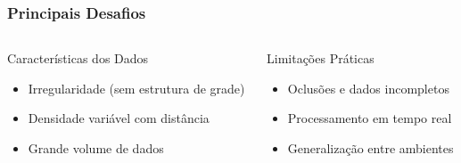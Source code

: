 \documentclass[aspectratio=169,t,xcolor=table]{beamer}
\begin{document}
\begin{frame}
    \frametitle{Principais Desafios}
    \begin{columns}[T]
        \begin{column}{.5\textwidth}
            \begin{block}{Características dos Dados}
                \begin{itemize}
                    \item<+-> Irregularidade (sem estrutura de grade)
                    \item<+-> Densidade variável com distância
                    \item<+-> Grande volume de dados
                \end{itemize}
            \end{block}
        \end{column}
        \begin{column}{.5\textwidth}
            \begin{block}{Limitações Práticas}
                \begin{itemize}
                    \item<+-> Oclusões e dados incompletos
                    \item<+-> Processamento em tempo real
                    \item<+-> Generalização entre ambientes
                \end{itemize}
            \end{block}
        \end{column}
    \end{columns}
\end{frame}
\end{document}
